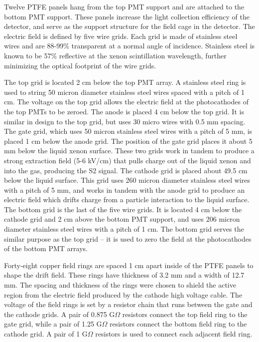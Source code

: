Twelve PTFE panels hang from the top PMT support and are attached to the bottom PMT support.  These panels increase the light collection efficiency of the detector, and serve as the support structure for the field cage in the detector.  The electric field is defined by five wire grids.  Each grid is made of stainless steel wires and are 88-99\% transparent at a normal angle of incidence.  Stainless steel is known to be 57\% reflective at the xenon scintillation wavelength, further minimizing the optical footprint of the wire grids.

The top grid is located 2 cm below the top PMT array.  A stainless steel ring is used to string 50 micron diameter stainless steel wires spaced with a pitch of 1 cm.  The voltage on the top grid allows the electric field at the photocathodes of the top PMTs to be zeroed.  The anode is placed 4 cm below the top grid.  It is similar in design to the top grid, but uses 30 micro wires with 0.5 mm spacing. The gate grid, which uses 50 micron stainless steel wires with a pitch of 5 mm, is placed 1 cm below the anode grid. The position of the gate grid places it about 5 mm below the liquid xenon surface.   These two grids work in tandem to produce a strong extraction field (5-6 kV/cm) that pulls charge out of the liquid xenon and into the gas, producing the S2 signal. The cathode grid is placed about 49.5 cm below the liquid surface. This grid uses 260 micron diameter stainless steel wires with a pitch of 5 mm, and works in tandem with the anode grid to produce an electric field which drifts charge from a particle interaction to the liquid surface.  The bottom grid is the last of the five wire grids.  It is located 4 cm below the cathode grid and 2 cm above the bottom PMT support, and uses 206 micron diameter stainless steel wires with a pitch of 1 cm.  The bottom grid serves the similar purpose as the top grid – it is used to zero the field at the photocathodes of the bottom PMT arrays.

Forty-eight copper field rings are spaced 1 cm apart inside of the PTFE panels to shape the drift field. These rings have thickness of 3.2 mm and a width of 12.7 mm.  The spacing and thickness of the rings were chosen to shield the active region from the electric field produced by the cathode high voltage cable.  The voltage of the field rings is set by a resistor chain that runs between the gate and the cathode grids.  A pair of  0.875 G$\Omega$ resistors connect the top field ring to the gate grid, while a pair of 1.25 G$\Omega$ resistors connect the bottom field ring to the cathode grid.  A pair of 1 G$\Omega$ resistors is used to connect each adjacent field ring.


